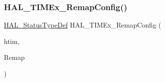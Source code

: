 \subsubsection{\texorpdfstring{H\+A\+L\+\_\+\+T\+I\+M\+Ex\+\_\+\+Remap\+Config()}{HAL\_TIMEx\_RemapConfig()}}
{\footnotesize\ttfamily \hyperlink{stm32f4xx__hal__def_8h_a63c0679d1cb8b8c684fbb0632743478f}{H\+A\+L\+\_\+\+Status\+Type\+Def} H\+A\+L\+\_\+\+T\+I\+M\+Ex\+\_\+\+Remap\+Config (\begin{DoxyParamCaption}\item[{\hyperlink{struct_t_i_m___handle_type_def}{T\+I\+M\+\_\+\+Handle\+Type\+Def} $\ast$}]{htim,  }\item[{uint32\+\_\+t}]{Remap }\end{DoxyParamCaption})}

